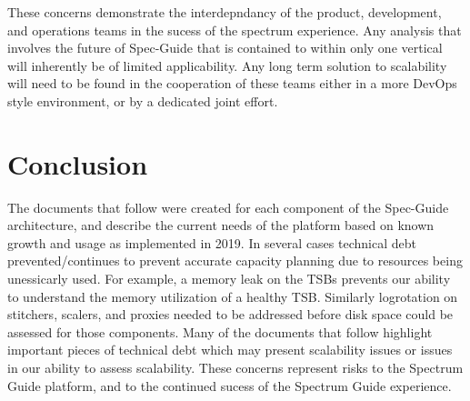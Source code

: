 \documentclass{article}
\begin{document}
These concerns demonstrate the interdepndancy of the product, development, and operations teams in the sucess of the spectrum experience. Any analysis that involves the future of Spec-Guide that is contained to within only one vertical will inherently be of limited applicability. Any long term solution to scalability will need to be found in the cooperation of these teams either in a more DevOps style environment, or by a dedicated joint effort. 



\newpage

\section{Conclusion}
\label{SECTION-Conclusion}

The documents that follow were created for each component of the Spec-Guide architecture, and describe the current needs of the platform based on known growth and usage as implemented in 2019. In several cases technical debt prevented/continues to prevent accurate capacity planning due to resources being unessicarly used. For example, a memory leak on the TSBs prevents our ability to understand the memory utilization of a healthy TSB. Similarly logrotation on stitchers, scalers, and proxies needed to be addressed before disk space could be assessed for those components. Many of the documents that follow highlight important pieces of technical debt which may present scalability issues or issues in our ability to assess scalability. These concerns represent risks to the Spectrum Guide platform, and to the continued sucess of the Spectrum Guide experience. 
\end{document}
